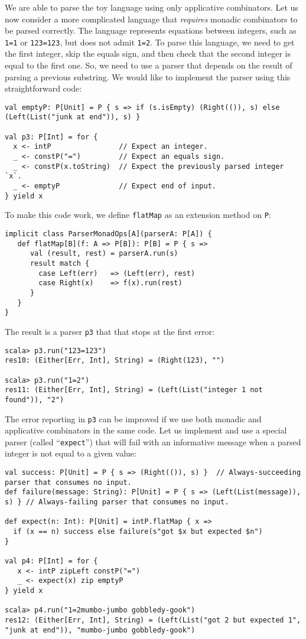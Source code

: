 We are able to parse the toy language using only applicative combinators.
Let us now consider a more complicated language that \emph{requires}
monadic combinators to be parsed correctly. The language represents
equations between integers, such as \lstinline!1=1! or \lstinline!123=123!,
but does not admit \lstinline!1=2!. To parse this language, we need
to get the first integer, skip the equals sign, and then check that
the second integer is equal to the first one. So, we need to use a
parser that depends on the result of parsing a previous substring.
We would like to implement the parser using this straightforward code:
\begin{lstlisting}
val emptyP: P[Unit] = P { s => if (s.isEmpty) (Right(()), s) else (Left(List("junk at end")), s) }

val p3: P[Int] = for {
  x <- intP                // Expect an integer.
  _ <- constP("=")         // Expect an equals sign.
  _ <- constP(x.toString)  // Expect the previously parsed integer `x`.
  _ <- emptyP              // Expect end of input.
} yield x 
\end{lstlisting}
To make this code work, we define \lstinline!flatMap! as an extension
method on \lstinline!P!:
\begin{lstlisting}
implicit class ParserMonadOps[A](parserA: P[A]) {
   def flatMap[B](f: A => P[B]): P[B] = P { s =>
      val (result, rest) = parserA.run(s)
      result match {
        case Left(err)   => (Left(err), rest)
        case Right(x)    => f(x).run(rest)
      }
   }
}
\end{lstlisting}
The result is a parser \lstinline!p3! that that stops at the first
error:
\begin{lstlisting}
scala> p3.run("123=123")
res10: (Either[Err, Int], String) = (Right(123), "")

scala> p3.run("1=2")
res11: (Either[Err, Int], String) = (Left(List("integer 1 not found")), "2")
\end{lstlisting}

The error reporting in \lstinline!p3! can be improved if we use both
monadic and applicative combinators in the same code. Let us implement
and use a special parser (called \textsf{``}\lstinline!expect!\textsf{''}) that will
fail with an informative message when a parsed integer is not equal
to a given value:
\begin{lstlisting}
val success: P[Unit] = P { s => (Right(()), s) }  // Always-succeeding parser that consumes no input.
def failure(message: String): P[Unit] = P { s => (Left(List(message)), s) } // Always-failing parser that consumes no input.

def expect(n: Int): P[Unit] = intP.flatMap { x =>
  if (x == n) success else failure(s"got $x but expected $n")
}

val p4: P[Int] = for {
   x <- intP zipLeft constP("=")
   _ <- expect(x) zip emptyP
} yield x

scala> p4.run("1=2mumbo-jumbo gobbledy-gook")
res12: (Either[Err, Int], String) = (Left(List("got 2 but expected 1", "junk at end")), "mumbo-jumbo gobbledy-gook")
\end{lstlisting}

